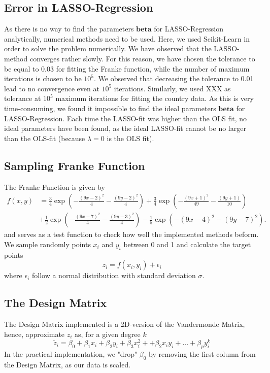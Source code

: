 \documentclass[11pt,a4paper]{article}
\begin{document}
\subsection{Error in LASSO-Regression}
As there is no way to find the parameters $\bm{beta}$ for LASSO-Regression analytically, numerical methods need to be used. Here, we used Scikit-Learn in order to solve the problem numerically. We have observed that the LASSO-method converges rather slowly. For this reason, we have chosen the tolerance to be equal to 0.03 for fitting the Franke function, while the number of maximum iterations is chosen to be $10^5$. We observed that decreasing the tolerance to 0.01 lead to no convergence even at $10^5$ iterations. Similarly, we used XXX as tolerance at $10^5$ maximum iterations for fitting the country data. As this is very time-consuming, we found it impossible to find the ideal parameters $\bm{beta}$ for LASSO-Regression. Each time the LASSO-fit was higher than the OLS fit, no ideal parameters have been found, as the ideal LASSO-fit cannot be no larger than the OLS-fit (because $\lambda=0$ is the OLS fit).
\subsection{Sampling Franke Function}
The Franke Function is given by
\begin{align*}
f(x,y) &= \frac{3}{4}\exp{\left(-\frac{(9x-2)^2}{4} - \frac{(9y-2)^2}{4}\right)}+\frac{3}{4}\exp{\left(-\frac{(9x+1)^2}{49}- \frac{(9y+1)}{10}\right)} \\
&+\frac{1}{2}\exp{\left(-\frac{(9x-7)^2}{4} - \frac{(9y-3)^2}{4}\right)} -\frac{1}{5}\exp{\left(-(9x-4)^2 - (9y-7)^2\right) }.
\end{align*}
and serves as a test function to check how well the implemented methods beform.
We sample randomly points $x_i$ and $y_i$ between 0 and 1 and calculate the target points
\begin{equation*}
z_i=f(x_i,y_i)+\epsilon_i
\end{equation*}
where $\epsilon_i$ follow a normal distribution with standard deviation $\sigma$.
\subsection{The Design Matrix}
The Design Matrix implemented is a 2D-version of the Vandermonde Matrix, hence, approximate $z_i$ as, for a given degree $k$
\begin{equation*}
\tilde z_i=\beta_0+\beta_1x_i+\beta_2y_i+\beta_3x_i^2++\beta_2x_iy_i+...+\beta_py_i^k
\end{equation*}
In the practical implementation, we "drop" $\beta_0$ by removing the first column from the Design Matrix, as our data is scaled.
\end{document}
